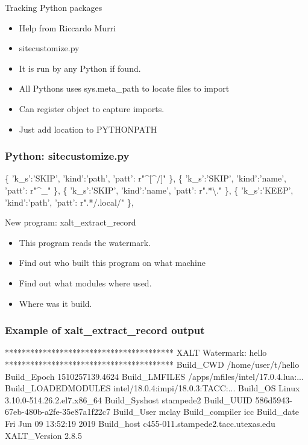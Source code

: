 \documentclass{beamer}
\begin{document}
\begin{frame}{Tracking Python packages}
  \begin{itemize}
    \item Help from Riccardo Murri
    \item sitecustomize.py
    \item It is run by any Python if found.
    \item All Pythons uses sys.meta\_path to locate files to import
    \item Can register object to capture imports.
    \item Just add location to PYTHONPATH
  \end{itemize}
\end{frame}

\begin{frame}[fragile]
    \frametitle{Python: sitecustomize.py}
 {\small
    \begin{semiverbatim}
\{ 'k\_s':'SKIP', 'kind':'path', 'patt': r"^[^/]" \},
\{ 'k\_s':'SKIP', 'kind':'name', 'patt': r"^_"    \},
\{ 'k\_s':'SKIP', 'kind':'name', 'patt': r".*\textbackslash." \},
\{ 'k\_s':'KEEP', 'kind':'path', 'patt': r".*/.local/" \},
    \end{semiverbatim}
}
\end{frame}

\begin{frame}{New program: xalt\_extract\_record}
  \begin{itemize}
    \item This program reads the watermark.
    \item Find out who built this program on what machine
    \item Find out what modules where used.
    \item Where was it build. 
  \end{itemize}
\end{frame}

\begin{frame}[fragile]
    \frametitle{Example of xalt\_extract\_record output}
 {\small
    \begin{semiverbatim}
****************************************
XALT Watermark: hello
****************************************
Build\_CWD            /home/user/t/hello
Build\_Epoch          1510257139.4624
Build\_LMFILES        /apps/mfiles/intel/17.0.4.lua:...
Build\_LOADEDMODULES  intel/18.0.4:impi/18.0.3:TACC:...
Build\_OS             Linux 3.10.0-514.26.2.el7.x86_64
Build\_Syshost        stampede2
Build\_UUID           586d5943-67eb-480b-a2fe-35e87a1f22c7
Build\_User           mclay
Build\_compiler       icc
Build\_date           Fri Jun 09 13:52:19 2019
Build\_host           c455-011.stampede2.tacc.utexas.edu
XALT\_Version         2.8.5
    \end{semiverbatim}
}
\end{frame}
\end{document}

